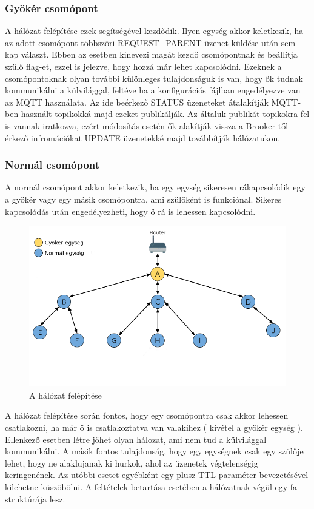 \subsubsection{Gyökér csomópont}
A hálózat felépítése ezek segítségével kezdődik. Ilyen egység akkor keletkezik, ha az adott csomópont többszöri REQUEST\_PARENT üzenet küldése után sem kap választ. Ebben az esetben kinevezi magát kezdő csomópontnak és beállítja szülő flag-et, ezzel is jelezve, hogy hozzá már lehet kapcsolódni. Ezeknek a csomópontoknak olyan további különleges tulajdonságuk is van, hogy ők tudnak kommunikálni a külvilággal, feltéve ha a konfigurációs fájlban engedélyezve van az MQTT használata. Az ide beérkező STATUS üzeneteket átalakítják MQTT-ben használt topikokká majd ezeket publikálják. Az általuk publikát topikokra fel is vannak iratkozva, ezért módosítás esetén ők alakítják vissza a Brooker-től érkező infromációkat UPDATE üzenetekké majd továbbítják hálózatukon.

\subsubsection{Normál csomópont}
A normál csomópont akkor keletkezik, ha egy egység sikeresen rákapcsolódik egy a gyökér vagy egy másik csomópontra, ami szülőként is funkciónal. Sikeres kapcsolódás után engedélyezheti, hogy ő rá is lehessen kapcsolódni.

\begin{figure}[!ht]
    \centering
    \includegraphics[width=150mm, keepaspectratio]{figures/mesh.png}
    \caption{A hálózat felépítése}
    \label{fig:TeXstudio}
\end{figure}

A hálózat felépítése során fontos, hogy egy csomópontra csak akkor lehessen csatlakozni, ha már ő is csatlakoztatva van valakihez ( kivétel a gyökér egység ). Ellenkező esetben létre jöhet olyan hálozat, ami nem tud a külvilággal kommunikálni. A másik fontos tulajdonság, hogy egy egységnek csak egy szülője lehet, hogy ne alaklujanak ki hurkok, ahol az üzenetek végtelenségig keringenének. Az utóbbi esetet egyébként egy plusz TTL paraméter bevezetésével kilehetne küszöbölni. A feltételek betartása esetében a hálózatnak végül egy fa struktúrája lesz.

